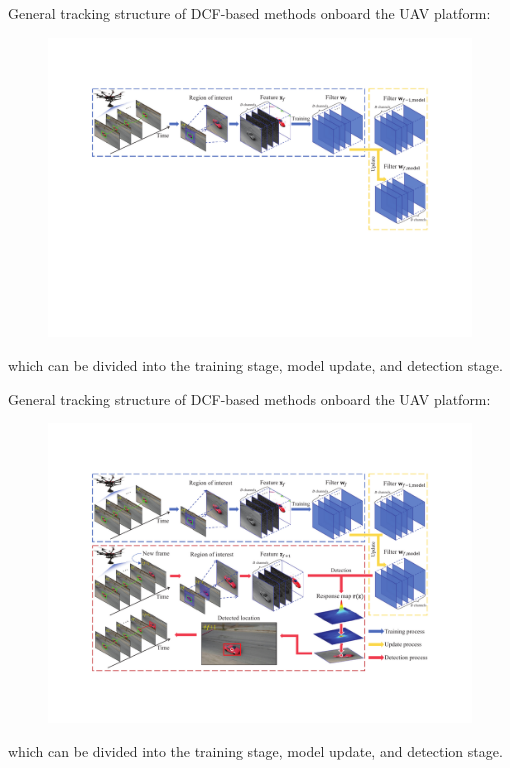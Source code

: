 \documentclass{beamer}
\begin{document}
\begin{frame}

    \addtocounter{footnote}{-1}
    General tracking structure of DCF-based methods onboard the UAV platform:

    \begin{figure}[htpb]
        \begin{center}
            \includegraphics[width=0.7\linewidth, trim={100pt 100 100 90}]{fig/tracking_2.pdf}
        \end{center}
    \end{figure}

    which can be divided into the training stage, \textcolor{deepred}{model update}, and detection stage.

\end{frame}

\begin{frame}

    \addtocounter{footnote}{-1}
    General tracking structure of DCF-based methods onboard the UAV platform:

    \begin{figure}[htpb]
        \begin{center}
            \includegraphics[width=0.7\linewidth, trim={100pt 100 100 90}]{fig/tracking_3.pdf}
        \end{center}
    \end{figure}

    which can be divided into the training stage, model update, and \textcolor{deepred}{detection stage}.

\end{frame}
\end{document}

